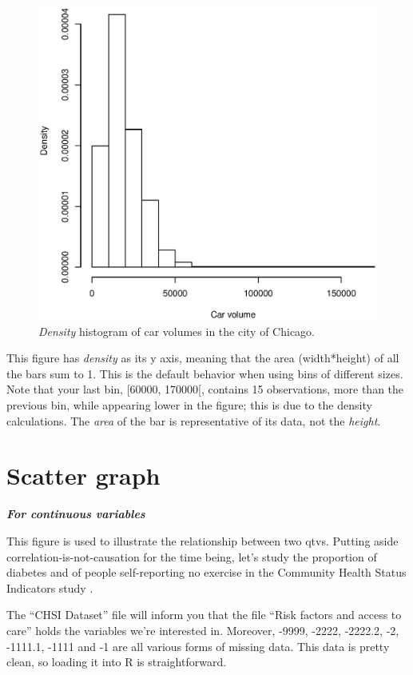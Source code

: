 \documentclass{report}
\newcommand{\notefor}[1]{\hfill\textbf{\textit{#1}}}
\begin{document}
	\begin{figure}[h]
		\centering
		\includegraphics[width=1.0\textwidth]{histd.eps}
		\caption{\emph{Density} histogram of car volumes in the city of Chicago.}
		\label{fig:histd}
	\end{figure}

	This figure has \emph{density} as its y axis, meaning that the area (width*height) of all the bars sum to 1. This is the default behavior when using bins of different sizes. Note that your last bin, [60000, 170000[, contains 15 observations, more than the previous bin, while appearing lower in the figure; this is due to the density calculations. The \emph{area} of the bar is representative of its data, not the \emph{height}.
	
	\section{Scatter graph}
	\notefor{For continuous variables}
	
	This figure is used to illustrate the relationship between two \glspl{qtv}. Putting aside correlation-is-not-causation for the time being, let's study the proportion of diabetes and of people self-reporting no exercise in the Community Health Status Indicators study \cite{chsi}.
	
	The ``CHSI Dataset'' file will inform you that the file ``Risk factors and access to care'' holds the variables we're interested in. Moreover, -9999, -2222, -2222.2, -2, -1111.1, -1111 and -1 are all various forms of missing data. This data is pretty clean, so loading it into R is straightforward.
	
\end{document}
